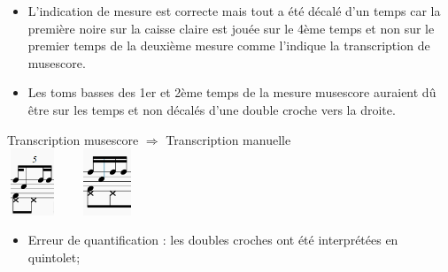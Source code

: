 \begin{itemize}
	\item L’indication de mesure est correcte mais tout a été décalé d’un temps car la première noire sur la caisse claire est jouée sur le 4ème temps et non sur le premier temps de la deuxième mesure comme l’indique la transcription de musescore.
	\item Les toms basses des 1er et 2ème temps de la mesure musescore auraient dû être sur les temps et non décalés d’une double croche vers la droite.\\
\end{itemize}
Transcription musescore $\Rightarrow$ Transcription manuelle\\
\includegraphics[height=20mm, width=15mm]{z_images/4_experimentations/1_analyse_midi_audio/0_drummer1_session3/4_musescore.png}\ \ \ \ 
\includegraphics[height=20mm, width=15mm]{z_images/4_experimentations/1_analyse_midi_audio/0_drummer1_session3/5_manuelle.png}\\
\begin{itemize}
	\item Erreur de quantification : les doubles croches ont été interprétées en quintolet;\\
\end{itemize}
